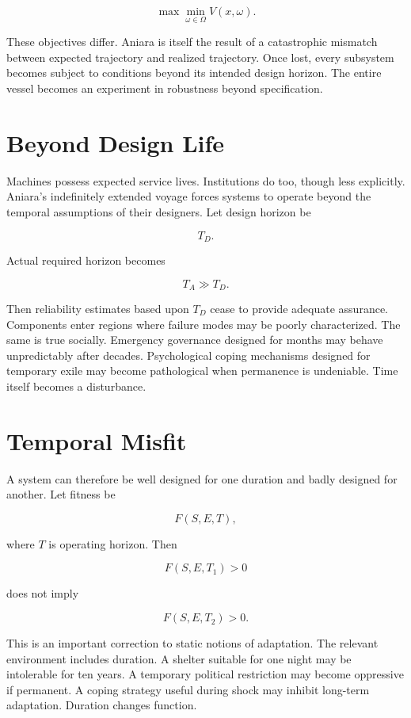 \documentclass[11pt,oneside]{book}
\theoremstyle{definition}
\theoremstyle{remark}
\begin{document}
\[
\max \min_{\omega\in\Omega} V(x,\omega).
\]

These objectives differ. Aniara is itself the result of a catastrophic mismatch between expected
trajectory and realized trajectory. Once lost, every subsystem becomes subject to conditions beyond
its intended design horizon. The entire vessel becomes an experiment in robustness beyond
specification.

\section{Beyond Design Life}

Machines possess expected service lives. Institutions do too, though less explicitly. Aniara's
indefinitely extended voyage forces systems to operate beyond the temporal assumptions of their
designers. Let design horizon be

\[
T_D.
\]

Actual required horizon becomes

\[
T_A\gg T_D.
\]

Then reliability estimates based upon \(T_D\) cease to provide adequate assurance. Components enter
regions where failure modes may be poorly characterized. The same is true socially. Emergency
governance designed for months may behave unpredictably after decades. Psychological coping
mechanisms designed for temporary exile may become pathological when permanence is undeniable. Time
itself becomes a disturbance.

\section{Temporal Misfit}

A system can therefore be well designed for one duration and badly designed for another. Let fitness
be

\[
F(S,E,T),
\]

where \(T\) is operating horizon. Then

\[
F(S,E,T_1)>0
\]

does not imply

\[
F(S,E,T_2)>0.
\]

This is an important correction to static notions of adaptation. The relevant environment includes
duration. A shelter suitable for one night may be intolerable for ten years. A temporary political
restriction may become oppressive if permanent. A coping strategy useful during shock may inhibit
long-term adaptation. Duration changes function.
\end{document}
